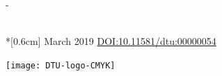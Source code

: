 \begin{adjustwidth*}{\unitlength}{-\unitlength}
\begin{adjustwidth}{-0.5cm}{-0.5cm}
        \noindent
        \parbox[b]{0.5\linewidth}{%
        	\noindent
            \Large 
            \thesisauthor{}\\*[0.6cm]
            \large
            \thesislocation{} \newline March 2019
            \small \medskip \newline
            \href{http://doi.org/10.11581/dtu:00000054}{DOI:10.11581/dtu:00000054}
        }
        \hfill\texttt{[image: DTU-logo-CMYK]}
    \end{adjustwidth}
\end{adjustwidth*}
\normalfont
\normalsize